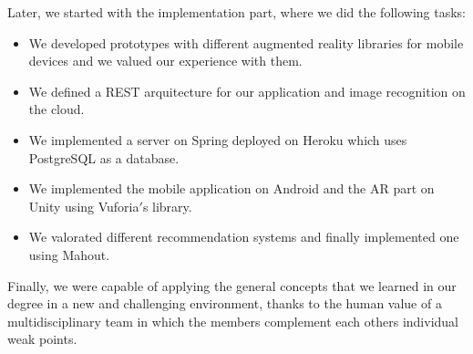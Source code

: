 Later, we started with the implementation part, where we did the following tasks:
\begin{itemize}
    \item We developed prototypes with different augmented reality libraries for mobile devices and we valued our experience with them.
    \item We defined a REST arquitecture for our application and image recognition on the cloud.
    \item We implemented a server on Spring deployed on Heroku which uses PostgreSQL as a database.
    \item We implemented the mobile application on Android and the AR part on Unity using Vuforia$'$s library.
    \item We valorated different recommendation systems and finally implemented one using Mahout.
\end{itemize}

Finally, we were capable of applying the general concepts that we learned in our degree in a new and challenging environment, thanks to the human value of a multidisciplinary team in which the members complement each others individual weak points.

